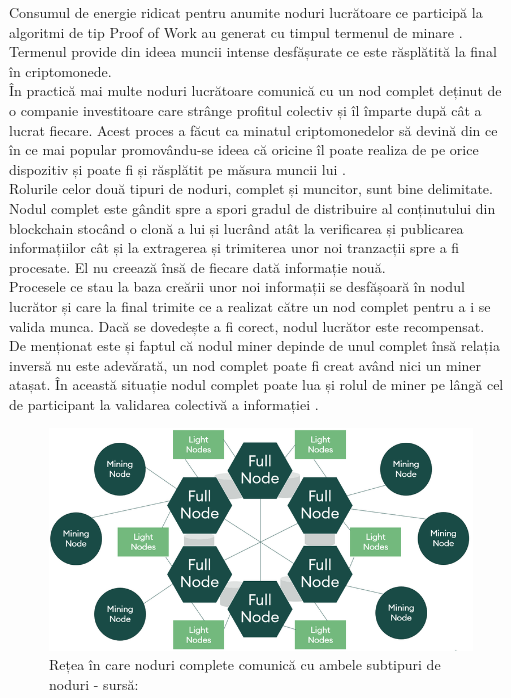 \begin{enumerate}
    Consumul de energie ridicat pentru anumite noduri lucrătoare ce participă la algoritmi de tip Proof of Work au generat cu timpul termenul de minare \cite{Blockchain_Node_Types}. Termenul provide din ideea muncii intense desfășurate ce este răsplătită la final în criptomonede.\\
    
    În practică mai multe noduri lucrătoare comunică cu un nod complet deținut de o companie investitoare care strânge profitul colectiv  și îl împarte după cât a lucrat fiecare. Acest proces a făcut ca minatul criptomonedelor să devină din ce în ce mai popular promovându-se ideea că oricine îl poate realiza de pe orice dispozitiv și poate fi și răsplătit pe măsura muncii lui \cite{Blockchain_Node_Types}.\\
    
    Rolurile celor două tipuri de noduri, complet și muncitor, sunt bine delimitate. Nodul complet este gândit spre a spori gradul de distribuire al conținutului din blockchain stocând o clonă a lui și lucrând atât la verificarea și publicarea informațiilor cât și la extragerea și trimiterea unor noi tranzacții spre a fi procesate. El nu creează însă de fiecare dată informație nouă.\\
    
    Procesele ce stau la baza creării unor noi informații se desfășoară în nodul lucrător și care la final trimite ce a realizat către un nod complet pentru a i se valida munca. Dacă se dovedește a fi corect, nodul lucrător este recompensat.\\
    
    De menționat este și faptul că nodul miner depinde de unul complet însă relația inversă nu este adevărată, un nod complet poate fi creat având nici un miner atașat. În această situație nodul complet poate lua și rolul de miner pe lângă cel de participant la validarea colectivă a informației \cite{Blockchain_Node_Types}.\\
    
    \begin{figure}[H] 
    \centering
    \includegraphics[scale=0.55]{Images/BC_WorkerNodes.png}
    \caption{Rețea în care noduri complete comunică cu ambele subtipuri de noduri - sursă: \cite{Blockchain_Node_Types}}
    \end{figure}
    
\end{enumerate}


